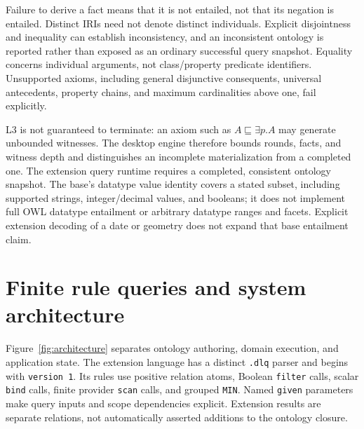\documentclass{article}
\newcommand{\code}[1]{\texttt{#1}}
\begin{document}
Failure to derive a fact means that it is not entailed, not that its negation is
entailed. Distinct IRIs need not denote distinct individuals. Explicit
disjointness and inequality can establish inconsistency, and an inconsistent
ontology is reported rather than exposed as an ordinary successful query
snapshot. Equality concerns individual arguments, not class/property predicate
identifiers. Unsupported axioms, including general disjunctive consequents,
universal antecedents, property chains, and maximum cardinalities above one,
fail explicitly.

L3 is not guaranteed to terminate: an axiom such as
$A\sqsubseteq\exists p.A$ may generate unbounded witnesses. The desktop engine
therefore bounds rounds, facts, and witness depth and distinguishes an
incomplete materialization from a completed one. The extension query runtime
requires a completed, consistent ontology snapshot. The base's datatype value
identity covers a stated subset, including supported strings, integer/decimal
values, and booleans; it does not implement full OWL datatype entailment or
arbitrary datatype ranges and facets. Explicit extension decoding of a date or
geometry does not expand that base entailment claim.

\section{Finite rule queries and system architecture}
\label{sec:architecture}
Figure~\ref{fig:architecture} separates ontology authoring, domain execution,
and application state. The extension language has a distinct \code{.dlq}
parser and begins with \code{version 1}. Its rules use positive relation atoms,
Boolean \code{filter} calls, scalar \code{bind} calls, finite provider
\code{scan} calls, and grouped \code{MIN}. Named \code{given} parameters make
query inputs and scope dependencies explicit. Extension results are separate
relations, not automatically asserted additions to the ontology closure.
\end{document}
